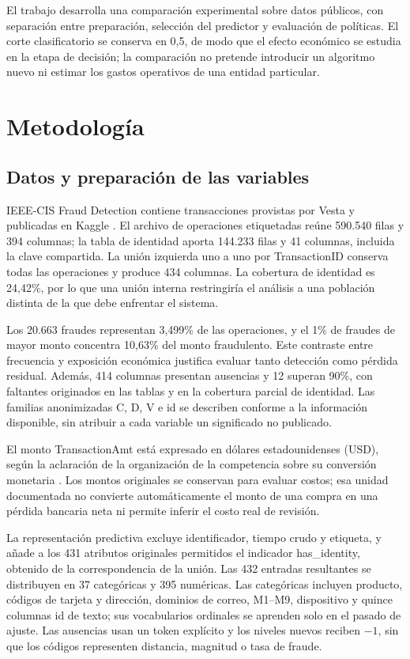 \documentclass[conference,letterpaper]{IEEEtran}
\begin{document}
El trabajo desarrolla una comparación experimental sobre datos públicos, con separación entre preparación, selección del predictor y evaluación de políticas. El corte clasificatorio se conserva en 0,5, de modo que el efecto económico se estudia en la etapa de decisión; la comparación no pretende introducir un algoritmo nuevo ni estimar los gastos operativos de una entidad particular.

\section{Metodología}
\subsection{Datos y preparación de las variables}
IEEE-CIS Fraud Detection contiene transacciones provistas por Vesta y publicadas en Kaggle \cite{dataset}. El archivo de operaciones etiquetadas reúne 590.540 filas y 394 columnas; la tabla de identidad aporta 144.233 filas y 41 columnas, incluida la clave compartida. La unión izquierda uno a uno por TransactionID conserva todas las operaciones y produce 434 columnas. La cobertura de identidad es 24,42\%, por lo que una unión interna restringiría el análisis a una población distinta de la que debe enfrentar el sistema.

Los 20.663 fraudes representan 3,499\% de las operaciones, y el 1\% de fraudes de mayor monto concentra 10,63\% del monto fraudulento. Este contraste entre frecuencia y exposición económica justifica evaluar tanto detección como pérdida residual. Además, 414 columnas presentan ausencias y 12 superan 90\%, con faltantes originados en las tablas y en la cobertura parcial de identidad. Las familias anonimizadas C, D, V e id se describen conforme a la información disponible, sin atribuir a cada variable un significado no publicado.

El monto TransactionAmt está expresado en dólares estadounidenses (USD), según la aclaración de la organización de la competencia sobre su conversión monetaria \cite{currency}. Los montos originales se conservan para evaluar costos; esa unidad documentada no convierte automáticamente el monto de una compra en una pérdida bancaria neta ni permite inferir el costo real de revisión.

La representación predictiva excluye identificador, tiempo crudo y etiqueta, y añade a los 431 atributos originales permitidos el indicador has\_identity, obtenido de la correspondencia de la unión. Las 432 entradas resultantes se distribuyen en 37 categóricas y 395 numéricas. Las categóricas incluyen producto, códigos de tarjeta y dirección, dominios de correo, M1--M9, dispositivo y quince columnas id de texto; sus vocabularios ordinales se aprenden solo en el pasado de ajuste. Las ausencias usan un token explícito y los niveles nuevos reciben $-1$, sin que los códigos representen distancia, magnitud o tasa de fraude.
\end{document}
